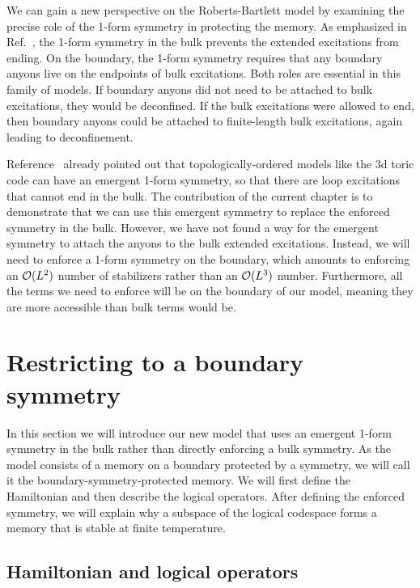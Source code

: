 We can gain a new perspective on the Roberts-Bartlett model by examining the precise role of the 1-form symmetry in protecting the memory. As emphasized in Ref.~\cite{RobertsBartlett2020}, the 1-form symmetry in the bulk prevents the extended excitations from ending. On the boundary, the 1-form symmetry requires that any boundary anyons live on the endpoints of bulk excitations. Both roles are essential in this family of models. If boundary anyons did not need to be attached to bulk excitations, they would be deconfined. If the bulk excitations were allowed to end, then boundary anyons could be attached to finite-length bulk excitations, again leading to deconfinement.

Reference~\cite{RobertsBartlett2020} already pointed out that topologically-ordered models like the 3d toric code can have an emergent 1-form symmetry, so that there are loop excitations that cannot end in the bulk. 
The contribution of the current chapter is to demonstrate that we can use this emergent symmetry to replace the enforced symmetry in the bulk. However, we have not found a way for the emergent symmetry to attach the anyons to the bulk extended excitations. Instead, we will  need to enforce a 1-form symmetry on the boundary, which amounts to enforcing an $\cal{O}(L^2)$ number of stabilizers rather than an $\cal{O}(L^3)$ number. Furthermore, all the terms we need to enforce will be on the boundary of our model, meaning they are more accessible than bulk terms would be.

\section{Restricting to a boundary symmetry} \label{sec:boundary}

In this section we will introduce our new model that uses an emergent 1-form symmetry in the bulk rather than directly enforcing a bulk symmetry. As the model consists of a memory on a boundary protected by a symmetry, we will call it the boundary-symmetry-protected memory. We will first define the Hamiltonian and then describe the logical operators. After defining the enforced symmetry, we will explain why a subspace of the logical codespace forms a memory that is stable at finite temperature.

\subsection{Hamiltonian and logical operators} \label{sub:Hamiltonian}

